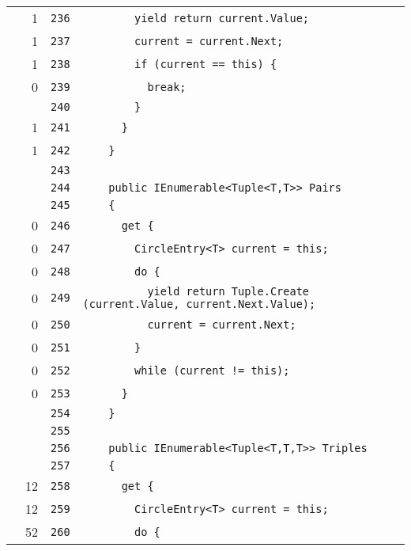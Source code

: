 \documentclass[a4paper,10pt]{article}
\begin{document}
\begin{longtable}[l]{lrrl}
\cellcolor{green} & 1 & \verb~236~ & \verb~        yield return current.Value;~\\
\cellcolor{green} & 1 & \verb~237~ & \verb~        current = current.Next;~\\
\cellcolor{green} & 1 & \verb~238~ & \verb~        if (current == this) {~\\
\cellcolor{red} & 0 & \verb~239~ & \verb~          break;~\\
\cellcolor{gray} &  & \verb~240~ & \verb~        }~\\
\cellcolor{green} & 1 & \verb~241~ & \verb~      }~\\
\cellcolor{green} & 1 & \verb~242~ & \verb~    }~\\
\cellcolor{gray} &  & \verb~243~ & \verb~~\\
\cellcolor{gray} &  & \verb~244~ & \verb~    public IEnumerable<Tuple<T,T>> Pairs~\\
\cellcolor{gray} &  & \verb~245~ & \verb~    {~\\
\cellcolor{red} & 0 & \verb~246~ & \verb~      get {~\\
\cellcolor{red} & 0 & \verb~247~ & \verb~        CircleEntry<T> current = this;~\\
\cellcolor{red} & 0 & \verb~248~ & \verb~        do {~\\
\cellcolor{red} & 0 & \verb~249~ & \verb~          yield return Tuple.Create (current.Value, current.Next.Value);~\\
\cellcolor{red} & 0 & \verb~250~ & \verb~          current = current.Next;~\\
\cellcolor{red} & 0 & \verb~251~ & \verb~        }~\\
\cellcolor{red} & 0 & \verb~252~ & \verb~        while (current != this);~\\
\cellcolor{red} & 0 & \verb~253~ & \verb~      }~\\
\cellcolor{gray} &  & \verb~254~ & \verb~    }~\\
\cellcolor{gray} &  & \verb~255~ & \verb~~\\
\cellcolor{gray} &  & \verb~256~ & \verb~    public IEnumerable<Tuple<T,T,T>> Triples~\\
\cellcolor{gray} &  & \verb~257~ & \verb~    {~\\
\cellcolor{green} & 12 & \verb~258~ & \verb~      get {~\\
\cellcolor{green} & 12 & \verb~259~ & \verb~        CircleEntry<T> current = this;~\\
\cellcolor{green} & 52 & \verb~260~ & \verb~        do {~\\

\end{longtable}
\end{document}
